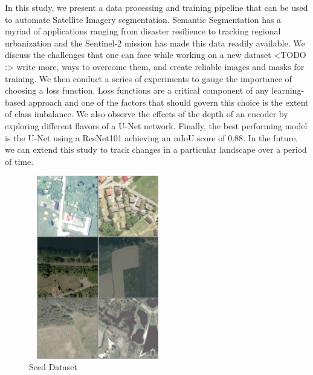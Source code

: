 \documentclass[conference]{IEEEtran}
\begin{document}
In this study, we present a data processing and training pipeline that can be used to automate Satellite Imagery segmentation. Semantic Segmentation has a myriad of applications ranging from disaster resilience to tracking regional urbanization and the Sentinel-2 mission has made this data readily available. We discuss the challenges that one can face while working on a new dataset <TODO :> write more, ways to overcome them, and create reliable images and masks for training. We then conduct a series of experiments to gauge the importance of choosing a loss function. Loss functions are a critical component of any learning-based approach and one of the factors that should govern this choice is the extent of class imbalance. We also observe the effects of the depth of an encoder by exploring different flavors of a U-Net network. Finally, the best performing model is the U-Net using a ResNet101 achieving an mIoU score of 0.88. In the future, we can extend this study to track changes in a particular landscape over a period of time.





\begin{figure}[h]
    \includegraphics[width=6cm, height=8cm]{images/dataset-vis.png}
    \caption{Seed Dataset}
\end{figure}
\printbibliography %
\end{document}
